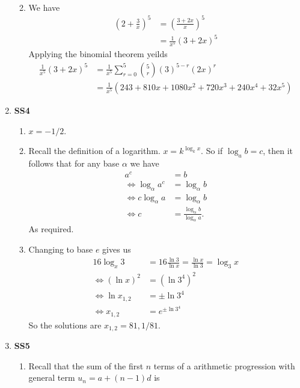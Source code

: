 \documentclass[12pt,oneside]{book}
\begin{document}
\begin{enumerate}
\begin{enumerate}
\begin{align*}
            \end{align*}
            \item We have \begin{align*}
                \left( 2 + \frac{3}{x} \right) ^5 &= \left( \frac{3 + 2x}{x} \right)^5 \\
                &= \frac{1}{x^5} (3 + 2x)^5 
            \end{align*}
            Applying the binomial theorem yeilds \begin{align*}
                \frac{1}{x^5} (3 + 2x)^5 &= \frac{1}{x^5} \sum_{r = 0}^{5} {5 \choose r} (3)^{5 - r} (2x)^{r} \\
                &= \frac{1}{x^5} \left( 243 + 810x + 1080 x^2 + 720 x^3 + 240 x^4 + 32 x^5 \right)
            \end{align*}
        \end{enumerate}
        \item \textbf{SS4} \begin{enumerate}
            \item $x = -1/2$.
            \item Recall the definition of a logarithm. $x = k^{\log_k x}$. So if $\log_a b = c$, then it follows that for any base $\alpha$ we have \begin{align*}
                a^c &=  b\\
                \iff \log_\alpha a^c &= \log_\alpha b \\
                \iff c \log_\alpha a &= \log_\alpha b \\
                \iff c &= \frac{\log_\alpha b}{\log_\alpha a}.
            \end{align*}
            As required.
            \item Changing to base $e$ gives us \begin{align*}
                16 \log_x 3 &= 16 \frac{\ln 3}{\ln x} = \frac{\ln x}{\ln 3} = \log_3 x \\
                \iff (\ln x)^2 &= (\ln 3^4)^2 \\
                \iff \ln x_{1,2} &= \pm \ln 3^4 \\
                \iff x_{1,2} &= e^{\pm \ln 3^4}
            \end{align*}
            So the solutions are $x_{1,2} = 81, 1/81$.
        \end{enumerate}
        \item \textbf{SS5} \begin{enumerate}
            \item Recall that the sum of the first $n$ terms of a arithmetic progression with general term $u_n = a + (n-1)d$ is \[
\]
\end{enumerate}
\end{enumerate}
\end{document}
